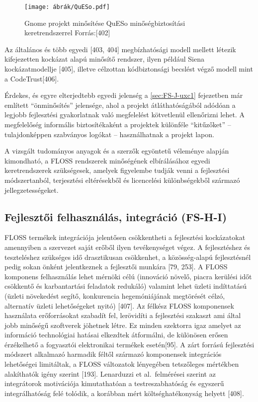 \documentclass[12pt,magyar,a4paper,oneside]{scrreprt}
\begin{document}
\begin{figure}
\hypertarget{fig:QuESo}{%
\centering
\texttt{[image: ábrák/QuESo.pdf]}
\caption{Gnome projekt minősítése QuESo minőségbiztosítási
keretrendszerrel Forrás:{[}402{]}}\label{fig:QuESo}
}
\end{figure}

Az általános és több egyedi {[}403, 404{]} megbízhatósági modell mellett
létezik kifejezetten kockázat alapú minősítő rendszer, ilyen például
Siena kockázatmodellje {[}405{]}, illetve célzottan kódbiztonsági
becslést végző modell mint a CodeTrust{[}406{]}.

Érdekes, és egyre elterjedtebb egyedi jelenség a \ref{sec:FS-J-uxc1}
fejezetben már említett ``önminősítés'' jelensége, ahol a projekt
átláthatóságából adódóan a legjobb fejlesztési gyakorlatnak való
megfelelést kötvetlenül ellenőrizni lehet. A megfelelőség informális
biztosítékaként a projektek különféle ``kitűzőket'' -- tulajdonképpen
szabványos logókat -- használhatnak a projekt lapon.

A vizsgált tudományos anyagok és a szerzők egyöntetű véleménye alapján
kimondható, a FLOSS rendszerek minőségének elbírálásához egyedi
keretrendszerek szükségesek, amelyek figyelembe tudják venni a
fejlesztési módszertanból, terjesztési eltérésekből és licencelési
különbségekből származó jellegzetességeket.

\hypertarget{sec:FS-H-I}{%
\subsection{Fejlesztői felhasználás, integráció
(FS-H-I)}\label{sec:FS-H-I}}

FLOSS termékek integrációja jelentősen csökkentheti a fejlesztési
kockázatokat amennyiben a szervezet saját erőből ilyen tevékenységet
végez. A fejlesztéshez és teszteléshez szükséges idő drasztikusan
csökkenhet, a közösség-alapú fejlesztésnél pedig sokan önként
jelentkeznek a fejlesztői munkára {[}79, 253{]}. A FLOSS komponens
felhasználás lehet mérnöki célú (innováció növelő, piacra kerülési időt
csökkentő és karbantartási feladatok redukáló) valamint lehet üzleti
indíttatású (üzleti növekedést segítő, konkurencia hegemóniájának
megtörését célzó, alternatív üzleti lehetőségeket nyitó) {[}407{]}. Az
félkész FLOSS komponensek használata erőforrásokat szabadít fel,
lerövidíti a fejlesztési szakaszt ami által jobb minőségű szoftverek
jöhetnek létre. Ez minden szektorra igaz amelyet az információ
technológiai hatásai elkezdtek átformálni, de különösen erősen
érzékelhető a fogyasztói elektronikai termékek esetén{[}95{]}. A zárt
forrású fejlesztési módszert alkalmazó harmadik féltől származó
komponensek integrációs lehetőségei limitáltak, a FLOSS változatok
lényegében tetszőleges mértékben alakíthatók igény szerint {[}193{]}.
Lenarduzzi et al.~felmérései szerint az integrátorok motivációja
kimutathatóan a testreszabhatóság és egyszerű integrálhatóság felé
tolódik, a korábban mért költséghatékonyság helyett {[}408{]}.
\end{document}
